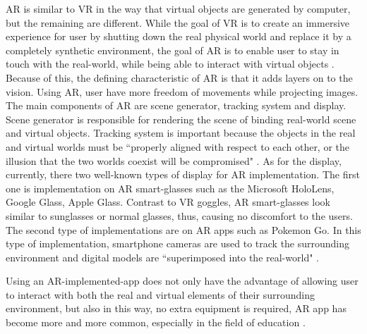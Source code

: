 AR is similar to VR in the way that virtual objects are generated by computer, but the remaining are different. While the goal of VR is to create an immersive experience for user by shutting down the real physical world and replace it by a completely synthetic environment, the goal of AR is to enable user to stay in touch with the real-world, while being able to interact with virtual objects \parencite{chamba-eras_augmented_2017}. Because of this, the defining characteristic of AR is that it adds layers on to the vision. Using AR, user have more freedom of movements while projecting images. The main components of AR are scene generator, tracking system and display. Scene generator is responsible for rendering the scene of binding real-world scene and virtual objects. Tracking system is important because the objects in the real and virtual worlds must be ``properly aligned with respect to each other, or the illusion that the two worlds coexist will be compromised" \parencite{silva_introduction_2003}. As for the display, currently, there two well-known types of display for AR implementation. The first one is implementation on AR smart-glasses such as the Microsoft HoloLens, Google Glass, Apple Glass. Contrast to VR goggles, AR smart-glasses look similar to sunglasses or normal glasses, thus, causing no discomfort to the users. 
The second type of implementations are on AR apps such as Pokemon Go. In this type of implementation, smartphone cameras are used to track the surrounding environment and digital models are ``superimposed into the real-world" \parencite{moro_effectiveness_2017}.

Using an AR-implemented-app does not only have the advantage of allowing user to interact with both the real and virtual elements of their surrounding environment, but also in this way, no extra equipment is required, AR app has become more and more common, especially in the field of education \parencite{moro_effectiveness_2017}.


